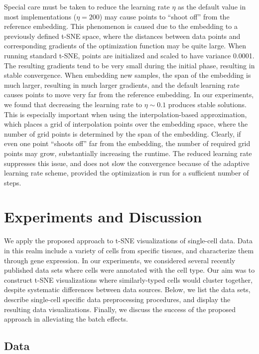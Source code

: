 \documentclass[runningheads]{llncs}
\begin{document}
Special care must be taken to reduce the learning rate $\eta$ as the default
value in most implementations ($\eta = 200$) may cause points to ``shoot off''
from the reference embedding. This phenomenon is caused due to the embedding to
a previously defined t-SNE space, where the distances between data points and
corresponding gradients of the optimization function may be quite large. When
running standard t-SNE, points are initialized and scaled to have variance
0.0001. The resulting gradients tend to be very small during the initial phase,
resulting in stable convergence. When embedding new samples, the span of the
embedding is much larger, resulting in much larger gradients, and the default
learning rate causes points to move very far from the reference embedding. In
our experiments, we found that decreasing the learning rate to $\eta \sim 0.1$
produces stable solutions. This is especially important when using the
interpolation-based approximation, which places a grid of interpolation
points over the embedding space, where the number of grid points is determined
by the span of the embedding. Clearly, if even one point ``shoots off'' far from the
embedding, the number of required grid points may grow, substantially
increasing the runtime. The reduced learning rate suppresses this issue, and
does not slow the convergence because of the adaptive learning rate scheme, provided
the optimization is run for a sufficient number of steps. 

\section{Experiments and Discussion}

We apply the proposed approach to t-SNE visualizations of
single-cell data. Data in this realm include a variety of
cells from specific tissues, and characterize them through gene expression.
In our experiments, we considered several recently published data
sets where cells were annotated with the cell type. Our aim was to construct
t-SNE visualizations where similarly-typed cells would cluster together,
despite systematic differences between data sources. Below, we list the data sets,
describe single-cell specific data preprocessing procedures, and display the
resulting data visualizations. Finally, we discuss the success of the proposed
approach in alleviating the batch effects.


\subsection{Data}
\end{document}
